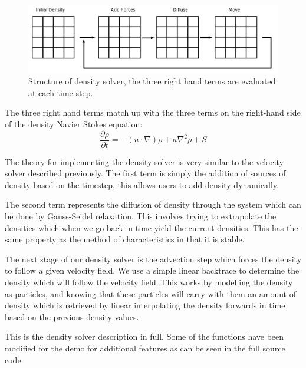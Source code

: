 \begin{figure}
\centering
\includegraphics[width=1\textwidth]{images/density_solver}
  \caption{Structure of density solver, the three right hand terms are evaluated at each time step.}
\end{figure}

The three right hand terms match up with the three terms on the right-hand side of the density Navier Stokes equation:
\begin{equation}
  \frac{\partial \rho}{\partial t} = -(u \cdot \nabla)\rho + \kappa \nabla^{2}\rho + S
\end{equation}

The theory for implementing the density solver is very similar to the velocity solver described previously.
The first term is simply the addition of sources of density based on the timestep, this allows users to add density dynamically.


The second term represents the diffusion of density through the system which can be done by Gauss-Seidel relaxation.
This involves trying to extrapolate the densities which when we go back in time yield the current densities.
This has the same property as the method of characteristics in that it is stable.


The next stage of our density solver is the advection step which forces the density to follow a given velocity field.
We use a simple linear backtrace to determine the density which will follow the velocity field. 
This works by modelling the density as particles, and knowing that these particles will carry with them an amount of density which is retrieved by linear interpolating the density forwards in time based on the previous density values.


This is the density solver description in full.
Some of the functions have been modified for the demo for additional features as can be seen in the full source code.

